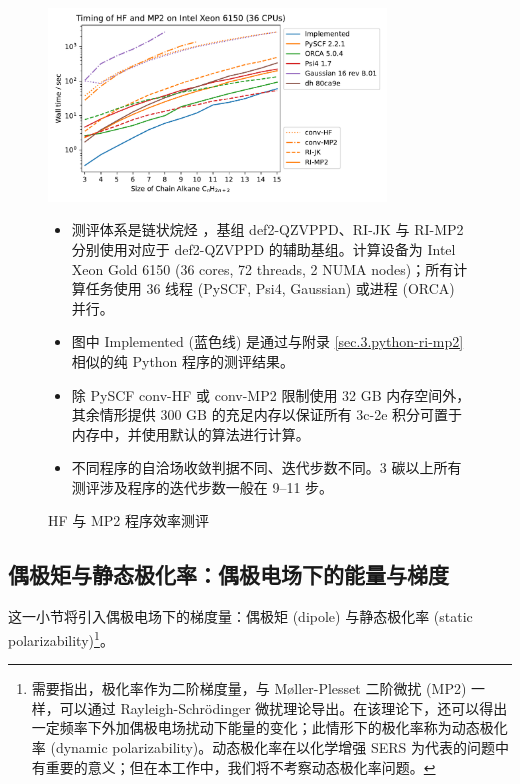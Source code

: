 \begin{figure}[b!]
  \centering
  \caption{HF 与 MP2 程序效率测评}
  \label{fig.3.timing-rimp2-implemented}
  \includegraphics[width=0.8\textwidth]{assets/timing-rimp2-implemented.pdf}

  \raggedright
  \begin{itemize}[nosep]
    \item 测评体系是链状烷烃 ，基组 def2-QZVPPD、RI-JK 与 RI-MP2 分别使用对应于 def2-QZVPPD 的辅助基组。计算设备为 Intel Xeon Gold 6150 (36 cores, 72 threads, 2 NUMA nodes)；所有计算任务使用 36 线程 (PySCF, Psi4, Gaussian) 或进程 (ORCA) 并行。
    \item 图中 Implemented (蓝色线) 是通过与附录 \ref{sec.3.python-ri-mp2} 相似的纯 Python 程序的测评结果。
    \item 除 PySCF conv-HF 或 conv-MP2 限制使用 32 GB 内存空间外，其余情形提供 300 GB 的充足内存以保证所有 3c-2e 积分可置于内存中，并使用默认的算法进行计算。
    \item 不同程序的自洽场收敛判据不同、迭代步数不同。3 碳以上所有测评涉及程序的迭代步数一般在 9--11 步。
  \end{itemize}
\end{figure}

\subsection{偶极矩与静态极化率：偶极电场下的能量与梯度}

这一小节将引入偶极电场下的梯度量：偶极矩 (dipole) 与静态极化率 (static polarizability)\footnote{需要指出，极化率作为二阶梯度量，与 M\o{}ller-Plesset 二阶微扰 (MP2) 一样，可以通过 Rayleigh-Schr\"odinger 微扰理论导出。在该理论下，还可以得出一定频率下外加偶极电场扰动下能量的变化；此情形下的极化率称为动态极化率 (dynamic polarizability)。动态极化率在以化学增强 SERS 为代表的问题中有重要的意义\cite{Jensen-Schatz.CSR.2008, Perez-Jimenez-Ren.CS.2020, Li-Xu.C.2022}；但在本工作中，我们将不考察动态极化率问题。}。


